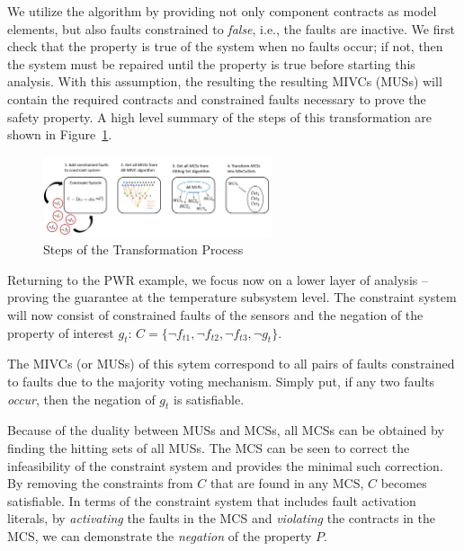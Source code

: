 We utilize the \aivcalg algorithm by providing not only component contracts as model elements, but also faults constrained to \textit{false}, i.e., the faults are inactive. We first check that the property is true of the system when no faults occur; if not, then the system must be repaired until the property is true before starting this analysis.  With this assumption, the resulting the resulting MIVCs (MUSs) will contain the required contracts and constrained faults necessary to prove the safety property. A high level summary of the steps of this transformation are shown in Figure~\ref{fig:trans}. 

\begin{figure}[h!]
	\begin{center}
		\includegraphics[width=0.6\textwidth]{images/highLevelIdea.PNG}
	\end{center}
	\caption{Steps of the Transformation Process}
	\label{fig:trans}
\end{figure}

Returning to the PWR example, we focus now on a lower layer of analysis -- proving the guarantee at the temperature subsystem level. The constraint system will now consist of constrained faults of the sensors and the negation of the property of interest $g_t$: $C = \{\neg f_{t1}, \neg f_{t2}, \neg f_{t3}, \neg g_t\}$. 

The MIVCs (or MUSs) of this sytem correspond to all pairs of faults constrained to faults due to the majority voting mechanism. Simply put, if any two faults \emph{occur}, then the negation of $g_t$ is satisfiable. 

Because of the duality between MUSs and MCSs, all MCSs can be obtained by finding the hitting sets of all MUSs. The MCS can be seen to correct the infeasibility of the constraint system and provides the minimal such correction. By removing the constraints from $C$ that are found in any MCS, $C$ becomes satisfiable. In terms of the constraint system that includes fault activation literals, by \textit{activating} the faults in the MCS and \textit{violating} the contracts in the MCS, we can demonstrate the \textit{negation} of the property $P$. 

